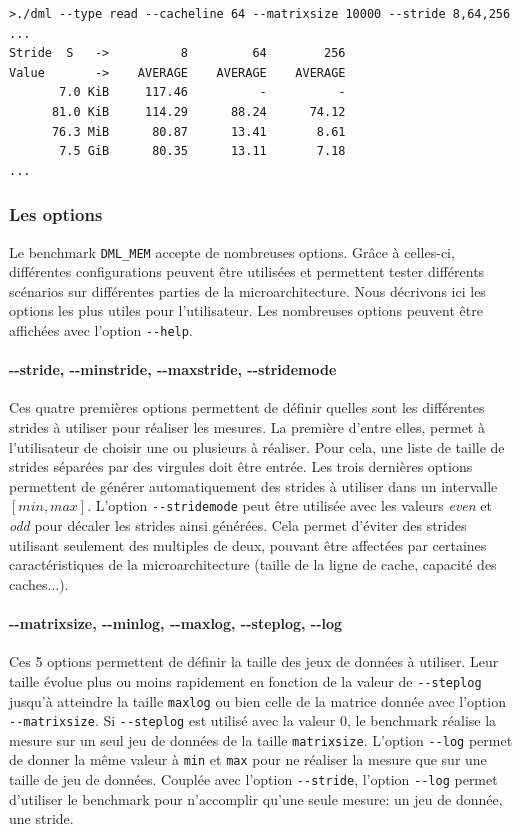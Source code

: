 \begin{verbatim}
>./dml --type read --cacheline 64 --matrixsize 10000 --stride 8,64,256
...
Stride  S   ->          8         64        256
Value       ->    AVERAGE    AVERAGE    AVERAGE
       7.0 KiB     117.46          -          -
      81.0 KiB     114.29      88.24      74.12
      76.3 MiB      80.87      13.41       8.61
       7.5 GiB      80.35      13.11       7.18
...
\end{verbatim}

  

    \subsubsection{Les options}
        Le benchmark \verb=DML_MEM= accepte de nombreuses options. Grâce à celles-ci, différentes configurations peuvent être utilisées et permettent tester différents scénarios sur différentes parties de la microarchitecture. Nous décrivons ici les options les plus utiles pour l'utilisateur. Les nombreuses options peuvent être affichées avec l'option \verb|--help|.
        
        
        \paragraph{-{}-stride, -{}-minstride, -{}-maxstride, -{}-stridemode} Ces quatre premières options permettent de définir quelles sont les différentes strides à utiliser pour réaliser les mesures. La première d'entre elles, permet à l'utilisateur de choisir une ou plusieurs à réaliser. Pour cela, une liste de taille de strides séparées par des virgules doit être entrée. Les trois dernières options permettent de générer automatiquement des strides à utiliser dans un intervalle $[min, max]$. L'option \verb|--stridemode| peut être utilisée avec les valeurs \textit{even} et \textit{odd} pour décaler les strides ainsi générées. Cela permet d'éviter des strides utilisant seulement des multiples de deux, pouvant être affectées par certaines caractéristiques de la microarchitecture (taille de la ligne de cache, capacité des caches...). 
        
        \paragraph{-{}-matrixsize, -{}-minlog, -{}-maxlog, -{}-steplog, -{}-log} Ces 5 options permettent de définir la taille des jeux de données à utiliser. Leur taille évolue plus ou moins rapidement en fonction de la valeur de \verb|--steplog| jusqu'à atteindre la taille \verb|maxlog| ou bien celle de la matrice donnée avec l'option \verb|--matrixsize|. Si \verb|--steplog| est utilisé avec la valeur $0$, le benchmark réalise la mesure sur un seul jeu de données de la taille \verb=matrixsize=. L'option \verb|--log| permet de donner la même valeur à \verb|min| et \verb|max| pour ne réaliser la mesure que sur une taille de jeu de données. Couplée avec l'option \verb|--stride|, l'option \verb=--log= permet d'utiliser le benchmark pour n'accomplir qu'une seule mesure: un jeu de donnée, une stride.
        
